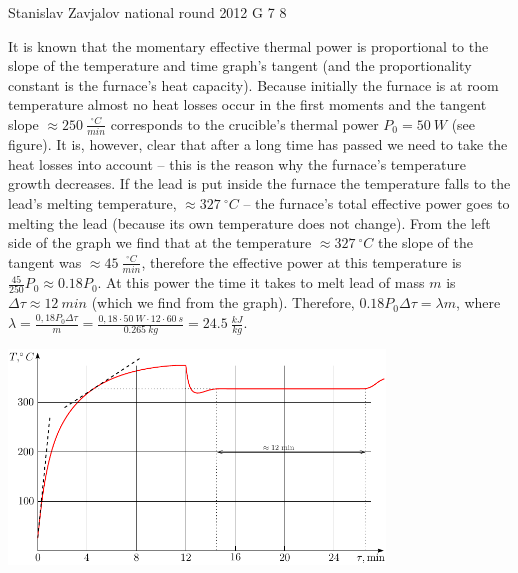 \documentclass[11pt]{article}
\begin{document}
{Stanislav Zavjalov} %
{national round} %
{2012} %
{G 7} %
{8} %
{

\ifEngSolution
It is known that the momentary effective thermal power is proportional to the slope of the temperature and time graph’s tangent (and the proportionality constant is the furnace’s heat capacity). Because initially the furnace is at room temperature almost no heat losses occur in the first moments and the tangent slope $\approx \SI{250}{\frac{^{\circ}C} {min}}$ corresponds to the crucible’s thermal power $P_0 = \SI{50}{W}$  (see figure). It is, however, clear that after a long time has passed we need to take the heat losses into account – this is the reason why the furnace’s temperature growth decreases. If the lead is put inside the furnace the temperature falls to the lead’s melting temperature, $\approx \SI{327}{^\circ C}$ – the furnace’s total effective power goes to melting the lead (because its own temperature does not change). From the left side of the graph we find that at the temperature $\approx \SI{327}{^\circ C}$ the slope of the tangent was $\approx \SI{45}{\frac{^{\circ}C} {min}}$, therefore the effective power at this temperature is $\frac{45}{250}P_0 \approx \num{0.18}P_0$. At this power the time it takes to melt lead of mass $m$ is $\Delta\tau \approx \SI{12}{min}$ (which we find from the graph). Therefore, $\num{0.18} P_0 \Delta\tau = \lambda m$, where $\lambda = \frac{0,18 P_0 \Delta \tau}{ m} = \frac{0,18 \cdot \SI{50}{W} \cdot 12 \cdot \SI{60}{s}}{\SI{0.265}{kg}} = \SI{24.5}{\frac{kJ}{kg}}$.
\begin{center}
\includegraphics[width = 0.75\textwidth]{2012-v3g-07-ahi_lah}
\end{center}
\fi
}
\end{document}
